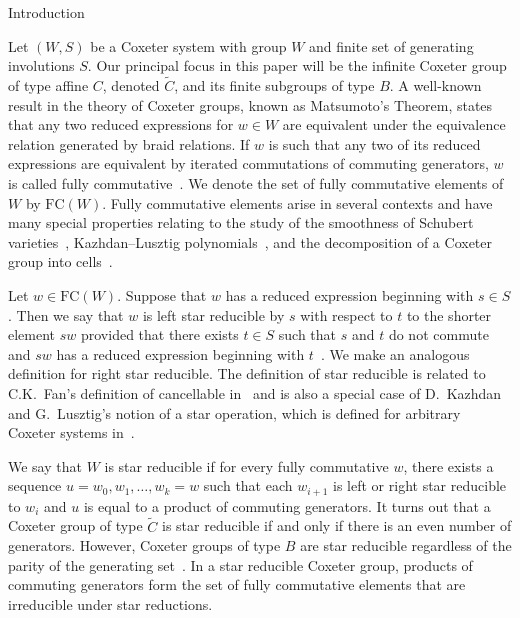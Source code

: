 \documentclass[12pt]{amsart}
\newcommand{\C}{\widetilde{C}}
\renewcommand{\(}{\left(}
\renewcommand{\)}{\right)}
\newcommand{\FC}{\mathrm{FC}}
\begin{document}
\begin{section}{Introduction}\label{sec:intro}

Let $(W,S)$ be a Coxeter system with group $W$ and finite set of generating involutions $S$.  Our principal focus in this paper will be the infinite Coxeter group of type affine $C$, denoted $\C$, and its finite subgroups of type $B$.  A well-known result in the theory of Coxeter groups, known as Matsumoto's Theorem, states that any two reduced expressions for $w \in W$ are equivalent under the equivalence relation generated by braid relations. If $w$ is such that any two of its reduced expressions are equivalent by iterated commutations of commuting generators, $w$ is called fully commutative~\cite{Stembridge.J:B}.  We denote the set of fully commutative elements of $W$ by $\FC(W)$.  Fully commutative elements arise in several contexts and have many special properties relating to the study of the smoothness of Schubert varieties~\cite{Fan.C:B}, Kazhdan--Lusztig polynomials~\cite{Billey.S;Jones.B:A,Green.R:K}, and the decomposition of a Coxeter group into cells~\cite{Green.R;Losonczy.J:B,Shi.J:B}.

Let $w \in \FC(W)$.  Suppose that $w$ has a reduced expression beginning with $s\in S$.  Then we say that $w$ is left star reducible by $s$ with respect to $t$ to the shorter element $sw$ provided that there exists $t \in S$ such that $s$ and $t$ do not commute and $sw$ has a reduced expression beginning with $t$~\cite{Green.R:P}.  We make an analogous definition for right star reducible.  The definition of star reducible is related to C.K.~Fan's definition of cancellable in~\cite[]{Fan.C:A} and is also a special case of D.~Kazhdan and G.~Lusztig's notion of a star operation, which is defined for arbitrary Coxeter systems in~\cite[]{Lusztig.G:A}.

We say that $W$ is star reducible if for every fully commutative $w$, there exists a sequence $u = w_0, w_1, \ldots, w_k = w$ such that each $w_{i+1}$ is left or right star reducible to $w_i$ and $u$ is equal to a product of commuting generators.  It turns out that a Coxeter group of type $\C$ is star reducible if and only if there is an even number of generators.  However, Coxeter groups of type $B$ are star reducible regardless of the parity of the generating set~\cite[Theorem 6.3]{Green.R:P}.  In a star reducible Coxeter group, products of commuting generators form the set of fully commutative elements that are irreducible under star reductions.


\end{section}
\end{document}

